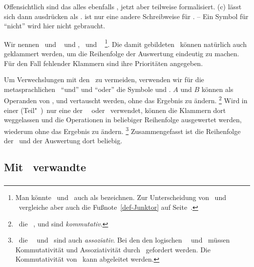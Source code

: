 Offensichtlich sind das alles ebenfalls \Aussagen, jetzt aber teilweise formalisiert.
(c) lässt sich dann ausdrücken als .
 ist nur eine andere Schreibweise für .
-- Ein Symbol für "`nicht"' wird hier nicht gebraucht.

Wir nennen \MtsAnd\ und \MtsOr\  und \MtsImp, \MtsRep\ und \MtsEquiv\ %
\footnote{%
	Man könnte \Metaoperationen\ und \Metarelationen\ auch als  bezeichnen. Zur Unterscheidung von \Operationen\ und \Relationen\ vergleiche aber auch die Fußnote~\ref{def-Junktor} auf Seite~\pageref{def-Junktor}.
}.
Die damit gebildeten \Aussagen\ können natürlich auch geklammert werden, um die Reihenfolge der Auswertung eindeutig zu machen.
Für den Fall fehlender Klammern sind ihre Prioritäten  angegeben.

Um Verwechslungen mit den \Junktoren\ zu vermeiden, verwenden wir für die metasprachlichen \Operationen\ "`und"' und "`oder"' die Symbole \chrqt{\MtsAnd} und \chrqt{\MtsOr}.
$A$ und $B$ können als Operanden von \chrqt{\MtsEquiv}, \chrqt{\MtsAnd} und \chrqt{\MtsOr} vertauscht werden, ohne das Ergebnis zu ändern.%
\footnote{%
	\textDh\ die \Operationen\ \chrqt{\MtsEquiv}, \chrqt{\MtsAnd} und \chrqt{\MtsOr} sind \emph{kommutativ}.
}
Wird in einer (Teil"~)\Aussage\ nur eine der \Operationen\ \MtsAnd\ oder \MtsOr\ verwendet, können die Klammern dort weggelassen und die Operationen in beliebiger Reihenfolge ausgewertet werden, wiederum ohne das Ergebnis zu ändern.%
\footnote{%
	\textDh\ die \Operationen\ \MtsAnd\ und \MtsOr\ sind auch \emph{assoziativ}.
	Bei den den logischen \Operationen\ \FrmAnd\ und \FrmOr\ müssen Kommutativität und Assoziativität durch \Axiome\ gefordert werden.
	Die Kommutativität von \MtsEquiv\ kann abgeleitet werden.
}
Zusammengefasst ist die Reihenfolge der \Operationen\ und der Auswertung dort beliebig.

\subsection[Mit Gleichheit verwandte Relationen]{Mit \Gleichheit\ verwandte \Relationen}
\label     {sub-Gleichheit}

\subsubsection[Vergleichbar]{\Vergleichbar}%
\label {subsub-Vergleichbar}

